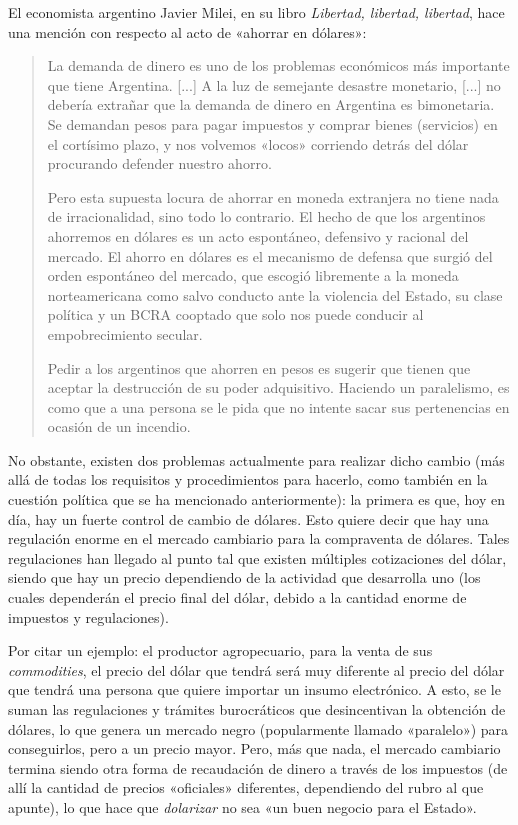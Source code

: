 \documentclass[12pt,a4paper,twoside]{book}
\begin{document}
El economista argentino Javier Milei, en su libro \textit{Libertad, libertad, libertad}, hace una mención con respecto al acto de «ahorrar en dólares»:

\begin{quotation}
La demanda de dinero es uno de los problemas económicos más importante que tiene Argentina. [...] A la luz de semejante desastre monetario, [...] no debería extrañar que la demanda de dinero en Argentina es bimonetaria. Se demandan pesos para pagar impuestos y comprar bienes (servicios) en el cortísimo plazo, y nos volvemos «locos» corriendo detrás del dólar procurando defender nuestro ahorro.

Pero esta supuesta locura de ahorrar en moneda extranjera no tiene nada de irracionalidad, sino todo lo contrario. El hecho de que los argentinos ahorremos en dólares es un acto espontáneo, defensivo y racional del mercado. El ahorro en dólares es el mecanismo de defensa que surgió del orden espontáneo del mercado, que escogió libremente a la moneda norteamericana como salvo conducto ante la violencia del Estado, su clase política y un BCRA cooptado que solo nos puede conducir al empobrecimiento secular.

Pedir a los argentinos que ahorren en pesos es sugerir que tienen que aceptar la destrucción de su poder adquisitivo. Haciendo un paralelismo, es como que a una persona se le pida que no intente sacar sus pertenencias en ocasión de un incendio. \cite{milei:libertad}
\end{quotation}

No obstante, existen dos problemas actualmente para realizar dicho cambio (más allá de todas los requisitos y procedimientos para hacerlo, como también en la cuestión política que se ha mencionado anteriormente): la primera es que, hoy en día, hay un fuerte control de cambio de dólares. Esto quiere decir que hay una regulación enorme en el mercado cambiario para la compraventa de dólares. Tales regulaciones han llegado al punto tal que existen múltiples cotizaciones del dólar, siendo que hay un precio dependiendo de la actividad que desarrolla uno (los cuales dependerán el precio final del dólar, debido a la cantidad enorme de impuestos y regulaciones).

Por citar un ejemplo: el productor agropecuario, para la venta de sus \textit{commodities}, el precio del dólar que tendrá será muy diferente al precio del dólar que tendrá una persona que quiere importar un insumo electrónico. A esto, se le suman las regulaciones y trámites burocráticos que desincentivan la obtención de dólares, lo que genera un mercado negro (popularmente llamado «paralelo») para conseguirlos, pero a un precio mayor. Pero, más que nada, el mercado cambiario termina siendo otra forma de recaudación de dinero a través de los impuestos (de allí la cantidad de precios «oficiales» diferentes, dependiendo del rubro al que apunte), lo que hace que \textit{dolarizar} no sea «un buen negocio para el Estado».
\end{document}
